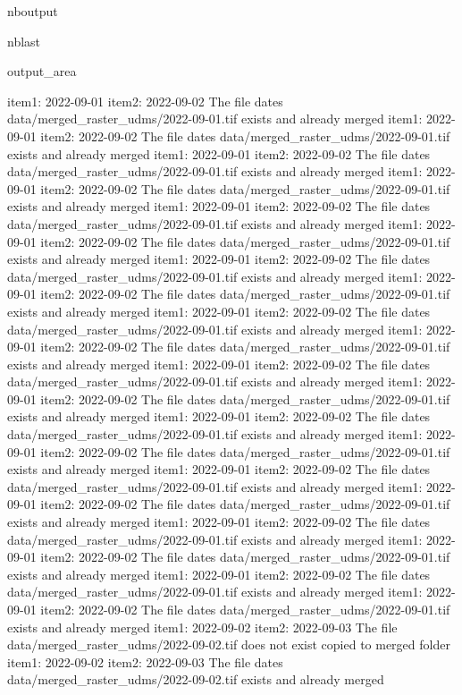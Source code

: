 \documentclass[letterpaper,10pt]{sphinxmanual}
\begin{document}
\begin{sphinxuseclass}{nboutput}
\begin{sphinxuseclass}{nblast}
{\begin{sphinxuseclass}{output_area}
\begin{sphinxuseclass}{}
\begin{sphinxVerbatim}[commandchars=\\\{\}]
item1:  2022-09-01
item2:  2022-09-02
The file dates data/merged\_raster\_udms/2022-09-01.tif exists and already merged
item1:  2022-09-01
item2:  2022-09-02
The file dates data/merged\_raster\_udms/2022-09-01.tif exists and already merged
item1:  2022-09-01
item2:  2022-09-02
The file dates data/merged\_raster\_udms/2022-09-01.tif exists and already merged
item1:  2022-09-01
item2:  2022-09-02
The file dates data/merged\_raster\_udms/2022-09-01.tif exists and already merged
item1:  2022-09-01
item2:  2022-09-02
The file dates data/merged\_raster\_udms/2022-09-01.tif exists and already merged
item1:  2022-09-01
item2:  2022-09-02
The file dates data/merged\_raster\_udms/2022-09-01.tif exists and already merged
item1:  2022-09-01
item2:  2022-09-02
The file dates data/merged\_raster\_udms/2022-09-01.tif exists and already merged
item1:  2022-09-01
item2:  2022-09-02
The file dates data/merged\_raster\_udms/2022-09-01.tif exists and already merged
item1:  2022-09-01
item2:  2022-09-02
The file dates data/merged\_raster\_udms/2022-09-01.tif exists and already merged
item1:  2022-09-01
item2:  2022-09-02
The file dates data/merged\_raster\_udms/2022-09-01.tif exists and already merged
item1:  2022-09-01
item2:  2022-09-02
The file dates data/merged\_raster\_udms/2022-09-01.tif exists and already merged
item1:  2022-09-01
item2:  2022-09-02
The file dates data/merged\_raster\_udms/2022-09-01.tif exists and already merged
item1:  2022-09-01
item2:  2022-09-02
The file dates data/merged\_raster\_udms/2022-09-01.tif exists and already merged
item1:  2022-09-01
item2:  2022-09-02
The file dates data/merged\_raster\_udms/2022-09-01.tif exists and already merged
item1:  2022-09-01
item2:  2022-09-02
The file dates data/merged\_raster\_udms/2022-09-01.tif exists and already merged
item1:  2022-09-01
item2:  2022-09-02
The file dates data/merged\_raster\_udms/2022-09-01.tif exists and already merged
item1:  2022-09-01
item2:  2022-09-02
The file dates data/merged\_raster\_udms/2022-09-01.tif exists and already merged
item1:  2022-09-01
item2:  2022-09-02
The file dates data/merged\_raster\_udms/2022-09-01.tif exists and already merged
item1:  2022-09-01
item2:  2022-09-02
The file dates data/merged\_raster\_udms/2022-09-01.tif exists and already merged
item1:  2022-09-01
item2:  2022-09-02
The file dates data/merged\_raster\_udms/2022-09-01.tif exists and already merged
item1:  2022-09-02
item2:  2022-09-03
The file data/merged\_raster\_udms/2022-09-02.tif does not exist copied to merged folder
item1:  2022-09-02
item2:  2022-09-03
The file dates data/merged\_raster\_udms/2022-09-02.tif exists and already merged

\end{sphinxVerbatim}
\end{sphinxuseclass}
\end{sphinxuseclass}}
\end{sphinxuseclass}
\end{sphinxuseclass}
\end{document}
